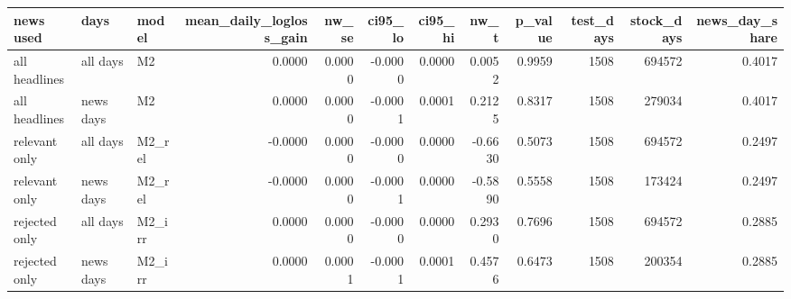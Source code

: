 \begin{tabular}{lllrrrrrrrrr}
\toprule
news used & days & model & mean\_daily\_logloss\_gain & nw\_se & ci95\_lo & ci95\_hi & nw\_t & p\_value & test\_days & stock\_days & news\_day\_share \\
\midrule
all headlines & all days & M2 & 0.0000 & 0.0000 & -0.0000 & 0.0000 & 0.0052 & 0.9959 & 1508 & 694572 & 0.4017 \\
all headlines & news days & M2 & 0.0000 & 0.0000 & -0.0001 & 0.0001 & 0.2125 & 0.8317 & 1508 & 279034 & 0.4017 \\
relevant only & all days & M2\_rel & -0.0000 & 0.0000 & -0.0000 & 0.0000 & -0.6630 & 0.5073 & 1508 & 694572 & 0.2497 \\
relevant only & news days & M2\_rel & -0.0000 & 0.0000 & -0.0001 & 0.0000 & -0.5890 & 0.5558 & 1508 & 173424 & 0.2497 \\
rejected only & all days & M2\_irr & 0.0000 & 0.0000 & -0.0000 & 0.0000 & 0.2930 & 0.7696 & 1508 & 694572 & 0.2885 \\
rejected only & news days & M2\_irr & 0.0000 & 0.0001 & -0.0001 & 0.0001 & 0.4576 & 0.6473 & 1508 & 200354 & 0.2885 \\
\bottomrule
\end{tabular}
